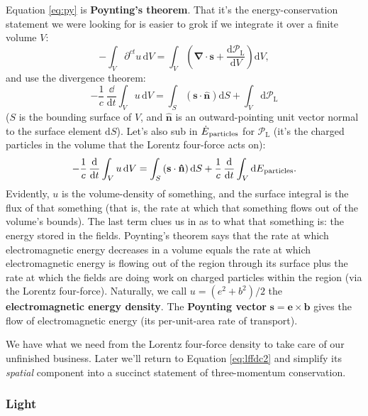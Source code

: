 \documentclass[12pt]{article}
\renewcommand{\vv}[1]{\mathbf{#1}}
\newcommand{\dd}[1]{\mathrm{d}#1}
\newcommand{\del}{\boldsymbol{\nabla}}
\begin{document}
Equation \ref{eq:py} is \textbf{Poynting's theorem}. That it's the energy-conservation statement we were looking for is easier to grok if we integrate it over a finite volume $V$:
\begin{equation*}
- \int_V \partial^{ct} u \, \dd V = \int_V \left(  \del \cdot \vv s + \dfrac{\dd \mathcal{P}_{\textrm{L}}}{\dd V} \right) \dd V ,
\end{equation*}
and use the divergence theorem:
\begin{equation*}
- \dfrac{1}{c} \, \dfrac{\dd}{\dd t} \int_V u \, \dd V = \int_S \left( \vv s \cdot \vv{\hat{n}} \right) \dd S + \int_V \dd \mathcal{P}_{\textrm{L}} 
\end{equation*}
($S$ is the bounding surface of $V$, and $\vv{\hat{n}}$ is an outward-pointing unit vector normal to the surface element $\dd S$). Let's also sub in $\dot{E}_{\mkern1mu \textrm{particles}}$ for $\mathcal{P}_{\textrm{L}}$ (it's the charged particles in the volume that the Lorentz four-force acts on):
\begin{equation*}
- \dfrac{1}{c} \, \dfrac{\dd}{\dd t} \int_V u \, \dd V = \int_S \left( \vv s \cdot \vv{\hat{n}} \right) \dd S + \dfrac{1}{c} \, \dfrac{\dd}{\dd t} \int_V \dd E_{\mkern1mu \textrm{particles}}.
\end{equation*}
Evidently, $u$ is the volume-density of something, and the surface integral is the flux of that something (that is, the rate at which that something flows out of the volume's bounds). The last term clues us in as to what that something is: the energy stored in the fields. Poynting's theorem says that the rate at which electromagnetic energy decreases in a volume equals the rate at which electromagnetic energy is flowing out of the region through its surface plus the rate at which the fields are doing work on charged particles within the region (via the Lorentz four-force). Naturally, we call $u = (e^2 + b^2)/2$ the \textbf{electromagnetic energy density}. The \textbf{Poynting vector} $\vv s = \vv e \times \vv b$ gives the flow of electromagnetic energy (its per-unit-area rate of transport).

We have what we need from the Lorentz four-force density to take care of our unfinished business. Later we'll return to Equation \ref{eq:lffdc2} and simplify its \emph{spatial} component into a succinct statement of three-momentum conservation.


\subsubsection{Light}\label{sssec:li}
\end{document}
